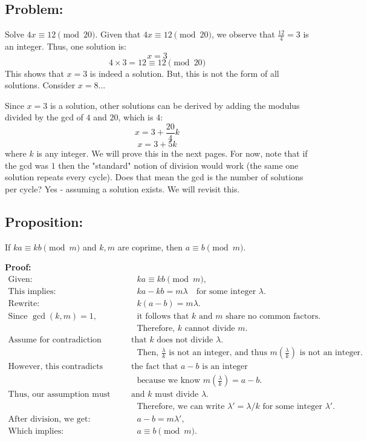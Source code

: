 \documentclass{article}
\begin{document}
\subsection*{Problem:} Solve \(4x \equiv 12 \pmod{20}\).
Given that \(4x \equiv 12 \pmod{20}\), we observe that \(\frac{12}{4} = 3\) is an integer. Thus, one solution is:
\[ x = 3 \]
\[ 4 \times 3 = 12 \equiv 12 \pmod{20} \]
This shows that \(x = 3\) is indeed a solution. But, this is not the form of all solutions. Consider \(x = 8\)...

Since \(x = 3\) is a solution, other solutions can be derived by adding the modulus divided by the gcd of \(4\) and \(20\), which is \(4\):
\[ x = 3 + \frac{20}{4}k \]
\[ x = 3 + 5k \]
where \(k\) is any integer.
We will prove this in the next pages. For now, note that if the gcd was \(1\) then the "standard" notion of division would work (the same one solution repeats every cycle). Does that mean the gcd is the number of solutions per cycle? Yes - assuming a solution exists. We will revisit this.

\subsection*{Proposition:} If \( ka \equiv kb \pmod{m} \) and \( k, m \) are coprime, then \( a \equiv b \pmod{m} \).

\textbf{Proof:}
\begin{align*}
\text{Given:} & \quad ka \equiv kb \pmod{m}, \\
\text{This implies:} & \quad ka - kb = m\lambda \quad \text{for some integer } \lambda. \\
\text{Rewrite:} & \quad k(a - b) = m\lambda. \\
\text{Since } \gcd(k, m) = 1, & \quad \text{it follows that } k \text{ and } m \text{ share no common factors.} \\
& \quad \text{Therefore, } k \text{ cannot divide } m. \\
\text{Assume for contradiction} & \text{ that } k \text{ does not divide } \lambda. \\
& \quad \text{Then, } \frac{\lambda}{k} \text{ is not an integer, and thus } m\left(\frac{\lambda}{k}\right) \text{ is not an integer.} \\
\text{However, this contradicts} & \text{ the fact that } a-b \text{ is an integer} \\
& \quad \text{because we know } m\left(\frac{\lambda}{k}\right) = a-b. \\
\text{Thus, our assumption must be wrong,} & \text{ and } k \text{ must divide } \lambda. \\
& \quad \text{Therefore, we can write } \lambda' = \lambda/k  \text{ for some integer } \lambda'. \\
\text{After division, we get: } & \quad a - b = m\lambda', \\
\text{Which implies:} & \quad a \equiv b \pmod{m}.
\end{align*}
\end{document}
